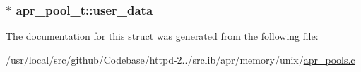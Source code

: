 \subsubsection[{\texorpdfstring{user\+\_\+data}{user_data}}]{$\ast$ apr\+\_\+pool\+\_\+t\+::user\+\_\+data}\hypertarget{structapr__pool__t_a57f166689174741c1775ebbab732a71d}{}\label{structapr__pool__t_a57f166689174741c1775ebbab732a71d}


The documentation for this struct was generated from the following file\+:\begin{DoxyCompactItemize}
\item 
/usr/local/src/github/\+Codebase/httpd-\/2../srclib/apr/memory/unix/\hyperlink{apr__pools_8c}{apr\+\_\+pools.\+c}\end{DoxyCompactItemize}
